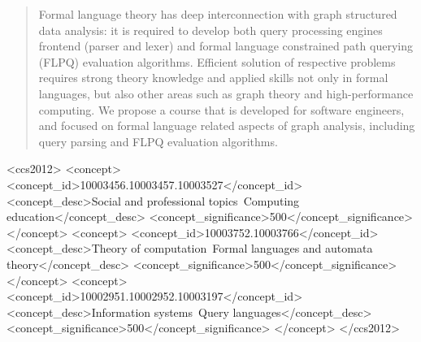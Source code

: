 \documentclass[sigconf]{acmart}
\begin{document}
\begin{abstract}
  Formal language theory has deep interconnection with graph structured data analysis: it is required to develop both query processing engines frontend (parser and lexer) and formal language constrained path querying (FLPQ) evaluation algorithms.
  Efficient solution of respective problems requires strong theory knowledge and applied skills not only in formal languages, but also other areas such as graph theory and high-performance computing.
  We propose a course that is developed for software engineers, and focused on formal language related aspects of graph analysis, including query parsing and FLPQ evaluation algorithms.
\end{abstract}

\begin{CCSXML}
<ccs2012>
  <concept>
      <concept_id>10003456.10003457.10003527</concept_id>
      <concept_desc>Social and professional topics~Computing education</concept_desc>
      <concept_significance>500</concept_significance>
      </concept>
  <concept>
      <concept_id>10003752.10003766</concept_id>
      <concept_desc>Theory of computation~Formal languages and automata theory</concept_desc>
      <concept_significance>500</concept_significance>
      </concept>
  <concept>
      <concept_id>10002951.10002952.10003197</concept_id>
      <concept_desc>Information systems~Query languages</concept_desc>
      <concept_significance>500</concept_significance>
      </concept>
</ccs2012>
\end{CCSXML}



\maketitle
\end{document}
